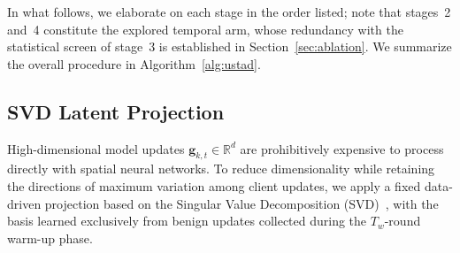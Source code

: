 \documentclass[journal]{IEEEtran}
\begin{document}
In what follows, we elaborate on each stage in the order listed; note that stages~2 and~4 constitute the explored temporal arm, whose redundancy with the statistical screen of stage~3 is established in Section~\ref{sec:ablation}. We summarize the overall procedure in Algorithm~\ref{alg:ustad}.

\subsection{SVD Latent Projection}

High-dimensional model updates $\mathbf{g}_{k,t} \in \mathbb{R}^d$ are prohibitively expensive to process directly with spatial neural networks. To reduce dimensionality while retaining the directions of maximum variation among client updates, we apply a fixed data-driven projection based on the Singular Value Decomposition (SVD)~\cite{zhang2015singular}, with the basis learned exclusively from benign updates collected during the $T_w$-round warm-up phase.
\end{document}
